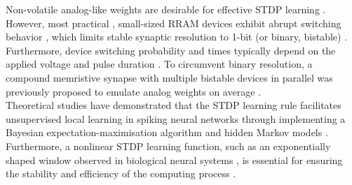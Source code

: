 

\noindent Non-volatile analog-like weights are desirable for effective STDP learning \cite{gaba2013stochastic}. However, most practical \cite{soni2011stochastic}, small-sized RRAM devices exhibit abrupt switching behavior \cite{yu2012switching}, which limits stable synaptic resolution to 1-bit (or binary, bistable) \cite{suri2013bio}.  Furthermore, device switching probability and times typically depend on the applied voltage and pulse duration \cite{li2014stochastic}. To circumvent binary resolution, a compound memristive synapse with multiple bistable devices in parallel was previously proposed to emulate analog weights on average \cite{bill2014compound}.\\


\noindent Theoretical studies have demonstrated that the STDP learning rule facilitates unsupervised local learning in spiking neural networks through implementing a Bayesian expectation-maximisation algorithm \cite{nessler2013bayesian} and hidden Markov models \cite{kappel2014stdp}. Furthermore, a nonlinear STDP learning function, such as an exponentially shaped window observed in biological neural systems \cite{toyoizumi2004spike}, is essential for ensuring the stability and efficiency of the computing process \cite{sprekeler2007slowness}.\\

